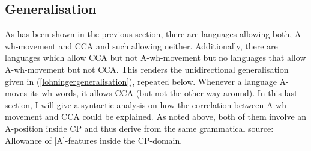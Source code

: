 \documentclass[output=paper,colorlinks,citecolor=brown]{langscibook}
\begin{document}
\subsection{Generalisation}
As has been shown in the previous section, there are languages allowing both, A-wh-movement and CCA and such allowing neither. Additionally, there are languages which allow CCA but not A-wh-movement but no languages that allow A-wh-movement but not CCA. This renders the unidirectional generalisation given in 
(\ref{lohningergeneralisation}), repeated below.
\ea Whenever a language A-moves its wh-words, it allows CCA (but not the other way around).
\z
In this last section, I will give a syntactic analysis on how the correlation between A-wh-movement and CCA could be explained. As noted above, both of them involve an A-position inside CP and thus derive from the same grammatical source: Allowance of [A]-features inside the CP-domain.
\end{document}
